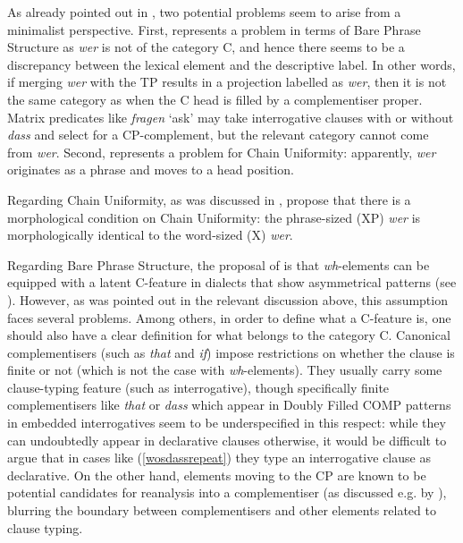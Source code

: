 As already pointed out in , two potential problems seem to arise from a minimalist perspective. First,  represents a problem in terms of Bare Phrase Structure as \textit{wer} is not of the category C, and hence there seems to be a discrepancy between the lexical element and the descriptive label. In other words, if merging \textit{wer} with the TP results in a projection labelled as \textit{wer}, then it is not the same category as when the C head is filled by a complementiser proper. Matrix predicates like \textit{fragen} `ask' may take interrogative clauses with or without \textit{dass} and select for a CP-complement, but the relevant category cannot come from \textit{wer}. Second,  represents a problem for Chain Uniformity: apparently, \textit{wer} originates as a phrase and moves to a head position.

Regarding Chain Uniformity, as was discussed in , \citet{bayerbrandner2008} propose that there is a morphological condition on Chain Uniformity: the phrase-sized (XP) \textit{wer} is morphologically identical to the word-sized (X) \textit{wer}.\largerpage

Regarding Bare Phrase Structure, the proposal of \citet{bayerbrandner2008} is that \textit{wh}-elements can be equipped with a latent C-feature in dialects that show asymmetrical patterns (see ). However, as was pointed out in the relevant discussion above, this assumption faces several problems. Among others, in order to define what a C-feature is, one should also have a clear definition for what belongs to the category C. Canonical complementisers (such as \textit{that} and \textit{if}) impose restrictions on whether the clause is finite or not (which is not the case with \textit{wh}-elements). They usually carry some clause-typing feature (such as interrogative), though specifically finite complementisers like \textit{that} or \textit{dass} which appear in Doubly Filled COMP patterns in embedded interrogatives seem to be underspecified in this respect: while they can undoubtedly appear in declarative clauses otherwise, it would be difficult to argue that in cases like (\ref{wosdassrepeat}) they type an interrogative clause as declarative. On the other hand, elements moving to the CP are known to be potential candidates for reanalysis into a complementiser (as discussed e.g. by \citealt{vangelderen2009}), blurring the boundary between complementisers and other elements related to clause typing.

